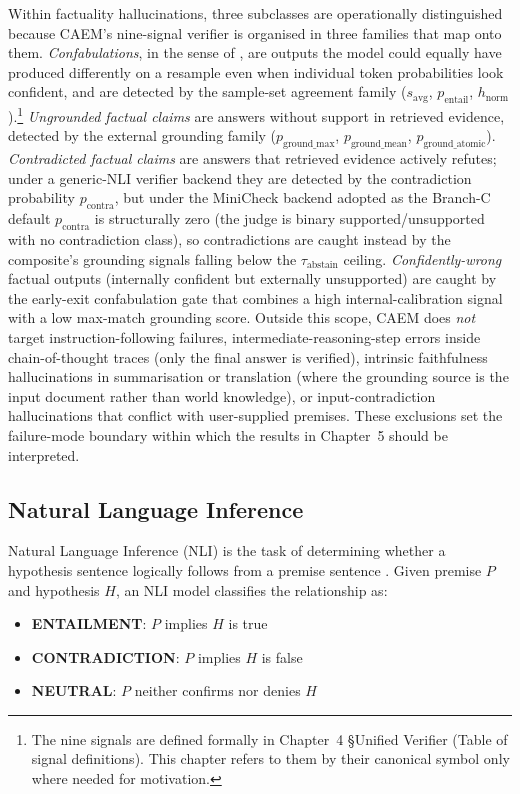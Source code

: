 Within factuality hallucinations, three subclasses are operationally distinguished because CAEM's nine-signal verifier is organised in three families that map onto them. \textit{Confabulations}, in the sense of \citet{farquhar2024semantic}, are outputs the model could equally have produced differently on a resample even when individual token probabilities look confident, and are detected by the sample-set agreement family ($s_{\text{avg}}$, $p_{\text{entail}}$, $h_{\text{norm}}$).\footnote{The nine signals are defined formally in Chapter~4 §Unified Verifier (Table of signal definitions). This chapter refers to them by their canonical symbol only where needed for motivation.} \textit{Ungrounded factual claims} are answers without support in retrieved evidence, detected by the external grounding family ($p_{\text{ground\_max}}$, $p_{\text{ground\_mean}}$, $p_{\text{ground\_atomic}}$). \textit{Contradicted factual claims} are answers that retrieved evidence actively refutes; under a generic-NLI verifier backend they are detected by the contradiction probability $p_{\text{contra}}$, but under the MiniCheck backend adopted as the Branch-C default $p_{\text{contra}}$ is structurally zero (the judge is binary supported/unsupported with no contradiction class), so contradictions are caught instead by the composite's grounding signals falling below the $\tau_{\text{abstain}}$ ceiling. \textit{Confidently-wrong} factual outputs (internally confident but externally unsupported) are caught by the early-exit confabulation gate that combines a high internal-calibration signal with a low max-match grounding score. Outside this scope, CAEM does \textit{not} target instruction-following failures, intermediate-reasoning-step errors inside chain-of-thought traces (only the final answer is verified), intrinsic faithfulness hallucinations in summarisation or translation (where the grounding source is the input document rather than world knowledge), or input-contradiction hallucinations that conflict with user-supplied premises. These exclusions set the failure-mode boundary within which the results in Chapter~5 should be interpreted.

\subsection{Natural Language Inference}

Natural Language Inference (NLI) is the task of determining whether a hypothesis sentence logically follows from a premise sentence \cite{10.1007/11736790_9}. Given premise $P$ and hypothesis $H$, an NLI model classifies the relationship as:
\begin{itemize}
    \item \textbf{ENTAILMENT}: $P$ implies $H$ is true
    \item \textbf{CONTRADICTION}: $P$ implies $H$ is false  
    \item \textbf{NEUTRAL}: $P$ neither confirms nor denies $H$
\end{itemize}

